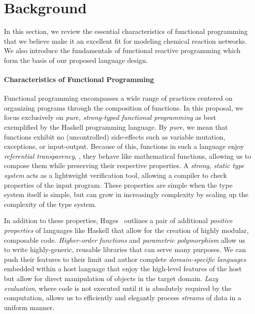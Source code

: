 
\section{Background}
\label{sec:frp_background}

In this section, we review the essential characteristics of functional programming that we believe make it an excellent fit for modeling chemical reaction networks.
We also introduce the fundamentals of functional reactive programming which form the basis of our proposed language design.

\paragraph{Characteristics of Functional Programming}

Functional programming encompasses a wide range of practices centered on organizing programs through the composition of functions.
In this proposal, we focus exclusively on \emph{pure, strong-typed functional programming} as best exemplified by the Haskell programming language.
By \emph{pure}, we mean that functions exhibit no (uncontrolled) side-effects such as variable mutation, exceptions, or input-output.
Because of this, functions in such a language enjoy \emph{referential transparency}, \ie, they behave like mathematical functions, allowing us to compose them while preserving their respective properties.
A \emph{strong, static type system} acts as a lightweight verification tool, allowing a compiler to check properties of the input program.
These properties are simple when the type system itself is simple, but can grow in increasingly complexity by scaling up the complexity of the type system.

In addition to these properties, Huges~\cite{huges:1990} outlines a pair of additional \emph{positive properties} of languages like Haskell that allow for the creation of highly modular, composable code.
\emph{Higher-order functions} and \emph{parametric polymorphism} allow us to write highly-generic, reusable libraries that can serve many purposes.
We can push their features to their limit and author complete \emph{domain-specific languages} embedded within a host language that enjoy the high-level features of the host but allow for direct manipulation of objects in the target domain.
\emph{Lazy evaluation}, where code is not executed until it is absolutely required by the computation, allows us to efficiently and elegantly process \emph{streams} of data in a uniform manner.

